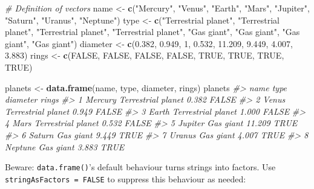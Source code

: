 \documentclass[]{book}
\newenvironment{Shaded}{\begin{snugshade}}{\end{snugshade}}
\newcommand{\KeywordTok}[1]{\textcolor[rgb]{0.13,0.29,0.53}{\textbf{#1}}}
\newcommand{\DecValTok}[1]{\textcolor[rgb]{0.00,0.00,0.81}{#1}}
\newcommand{\FloatTok}[1]{\textcolor[rgb]{0.00,0.00,0.81}{#1}}
\newcommand{\StringTok}[1]{\textcolor[rgb]{0.31,0.60,0.02}{#1}}
\newcommand{\CommentTok}[1]{\textcolor[rgb]{0.56,0.35,0.01}{\textit{#1}}}
\newcommand{\OtherTok}[1]{\textcolor[rgb]{0.56,0.35,0.01}{#1}}
\newcommand{\NormalTok}[1]{#1}
\begin{document}
\begin{Shaded}
\begin{Highlighting}[]
\CommentTok{# Definition of vectors}
\NormalTok{name <-}\StringTok{ }\KeywordTok{c}\NormalTok{(}\StringTok{"Mercury"}\NormalTok{, }\StringTok{"Venus"}\NormalTok{, }\StringTok{"Earth"}\NormalTok{, }\StringTok{"Mars"}\NormalTok{, }\StringTok{"Jupiter"}\NormalTok{, }\StringTok{"Saturn"}\NormalTok{, }\StringTok{"Uranus"}\NormalTok{, }\StringTok{"Neptune"}\NormalTok{)}
\NormalTok{type <-}\StringTok{ }\KeywordTok{c}\NormalTok{(}\StringTok{"Terrestrial planet"}\NormalTok{, }\StringTok{"Terrestrial planet"}\NormalTok{, }\StringTok{"Terrestrial planet"}\NormalTok{, }\StringTok{"Terrestrial planet"}\NormalTok{, }\StringTok{"Gas giant"}\NormalTok{, }\StringTok{"Gas giant"}\NormalTok{, }\StringTok{"Gas giant"}\NormalTok{, }\StringTok{"Gas giant"}\NormalTok{)}
\NormalTok{diameter <-}\StringTok{ }\KeywordTok{c}\NormalTok{(}\FloatTok{0.382}\NormalTok{, }\FloatTok{0.949}\NormalTok{, }\DecValTok{1}\NormalTok{, }\FloatTok{0.532}\NormalTok{, }\FloatTok{11.209}\NormalTok{, }\FloatTok{9.449}\NormalTok{, }\FloatTok{4.007}\NormalTok{, }\FloatTok{3.883}\NormalTok{)}
\NormalTok{rings <-}\StringTok{ }\KeywordTok{c}\NormalTok{(}\OtherTok{FALSE}\NormalTok{, }\OtherTok{FALSE}\NormalTok{, }\OtherTok{FALSE}\NormalTok{, }\OtherTok{FALSE}\NormalTok{, }\OtherTok{TRUE}\NormalTok{, }\OtherTok{TRUE}\NormalTok{, }\OtherTok{TRUE}\NormalTok{, }\OtherTok{TRUE}\NormalTok{)}

\NormalTok{planets <-}\StringTok{ }\KeywordTok{data.frame}\NormalTok{(name, type, diameter, rings)}
\NormalTok{planets}
\CommentTok{#>      name               type diameter rings}
\CommentTok{#> 1 Mercury Terrestrial planet    0.382 FALSE}
\CommentTok{#> 2   Venus Terrestrial planet    0.949 FALSE}
\CommentTok{#> 3   Earth Terrestrial planet    1.000 FALSE}
\CommentTok{#> 4    Mars Terrestrial planet    0.532 FALSE}
\CommentTok{#> 5 Jupiter          Gas giant   11.209  TRUE}
\CommentTok{#> 6  Saturn          Gas giant    9.449  TRUE}
\CommentTok{#> 7  Uranus          Gas giant    4.007  TRUE}
\CommentTok{#> 8 Neptune          Gas giant    3.883  TRUE}
\end{Highlighting}
\end{Shaded}

Beware: \texttt{data.frame()}'s default behaviour turns strings into
factors. Use \texttt{stringAsFactors\ =\ FALSE} to suppress this
behaviour as needed:
\end{document}
